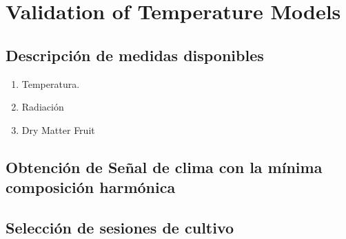 
    \chapter{Validation of Temperature Models}
    
    

%




    \section{Descripción de medidas disponibles } 


    \begin{enumerate}
        \item Temperatura.
        \item Radiación
        \item Dry Matter Fruit
    \end{enumerate}

    \section{Obtención de Señal de clima con la mínima composición harmónica}

    \section{Selección de sesiones de cultivo}